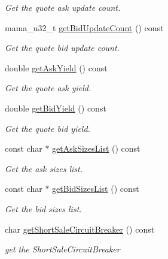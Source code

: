 \begin{CompactItemize}
\begin{CompactList}\small\item\em Get the quote ask update count. \item\end{CompactList}\item 
mama\_\-u32\_\-t \hyperlink{classWombat_1_1MamdaQuoteListener_d9c60e9325eaaa4ae2b5af91201dfb3f}{get\-Bid\-Update\-Count} () const 
\begin{CompactList}\small\item\em Get the quote bid update count. \item\end{CompactList}\item 
double \hyperlink{classWombat_1_1MamdaQuoteListener_49a6a64974327a037d1470cf433d93e0}{get\-Ask\-Yield} () const 
\begin{CompactList}\small\item\em Get the quote ask yield. \item\end{CompactList}\item 
double \hyperlink{classWombat_1_1MamdaQuoteListener_17999949e20889d0d319e71874949d25}{get\-Bid\-Yield} () const 
\begin{CompactList}\small\item\em Get the quote bid yield. \item\end{CompactList}\item 
const char $\ast$ \hyperlink{classWombat_1_1MamdaQuoteListener_9aa5070318fdfb0cc239fb6f11e286c0}{get\-Ask\-Sizes\-List} () const 
\begin{CompactList}\small\item\em Get the ask sizes list. \item\end{CompactList}\item 
const char $\ast$ \hyperlink{classWombat_1_1MamdaQuoteListener_93be6aa13008fc17858aafac4d212eb5}{get\-Bid\-Sizes\-List} () const 
\begin{CompactList}\small\item\em Get the bid sizes list. \item\end{CompactList}\item 
char \hyperlink{classWombat_1_1MamdaQuoteListener_2638f27bca3f6fa7c673e5b6924e3842}{get\-Short\-Sale\-Circuit\-Breaker} () const 
\begin{CompactList}\small\item\em get the Short\-Sale\-Circuit\-Breaker \item\end{CompactList}\item 

\end{CompactItemize}
